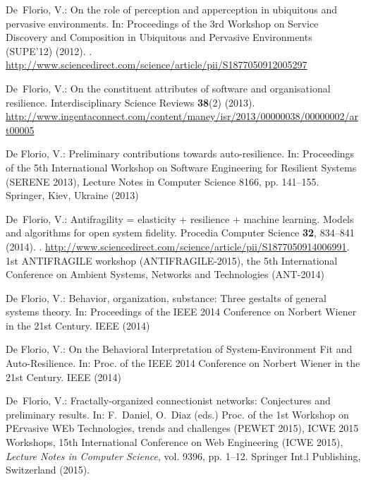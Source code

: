 \documentclass[twocolumn]{svjour3}
\begin{document}
\begin{thebibliography}{10}
De~Florio, V.: On the role of perception and apperception in ubiquitous and
  pervasive environments.
\newblock In: Proceedings of the 3rd Workshop on Service Discovery and
  Composition in Ubiquitous and Pervasive Environments (SUPE'12) (2012).
\newblock {}.
\newblock
  \urlprefix\url{http://www.sciencedirect.com/science/article/pii/S1877050912005297}

{De~Florio}, V.: On the constituent attributes of software and organisational
  resilience.
\newblock Interdisciplinary Science Reviews \textbf{38}(2) (2013).
\newblock
  \urlprefix\url{http://www.ingentaconnect.com/content/maney/isr/2013/00000038/00000002/art00005}

{De Florio}, V.: Preliminary contributions towards auto-resilience.
\newblock In: Proceedings of the 5th International Workshop on Software
  Engineering for Resilient Systems (SERENE 2013), Lecture Notes in Computer
  Science 8166, pp. 141--155. Springer, Kiev, Ukraine (2013)

{De~Florio}, V.: Antifragility = elasticity + resilience + machine learning.
  {Models} and algorithms for open system fidelity.
\newblock Procedia Computer Science \textbf{32}, 834--841 (2014).
\newblock {}.
\newblock
  \urlprefix\url{http://www.sciencedirect.com/science/article/pii/S1877050914006991}.
\newblock 1st ANTIFRAGILE workshop (ANTIFRAGILE-2015), the 5th International
  Conference on Ambient Systems, Networks and Technologies (ANT-2014)

{De Florio}, V.: Behavior, organization, substance: Three gestalts of general
  systems theory.
\newblock In: Proceedings of the IEEE 2014 Conference on Norbert Wiener in the
  21st Century. IEEE (2014)

{De Florio}, V.: {On the Behavioral Interpretation of System-Environment Fit
  and Auto-Resilience}.
\newblock In: Proc. of the {IEEE} 2014 Conference on {N}orbert {W}iener in the
  21st Century. IEEE (2014)

{De~Florio}, V.: Fractally-organized connectionist networks: Conjectures and
  preliminary results.
\newblock In: F.~Daniel, O.~Diaz (eds.) Proc. of the 1st Workshop on PErvasive
  WEb Technologies, trends and challenges (PEWET 2015), ICWE 2015 Workshops,
  15th International Conference on Web Engineering (ICWE 2015), \emph{Lecture
  Notes in Computer Science}, vol. 9396, pp. 1--12. Springer Int.l Publishing,
  Switzerland (2015).
\newblock {}


\end{thebibliography}
\end{document}
